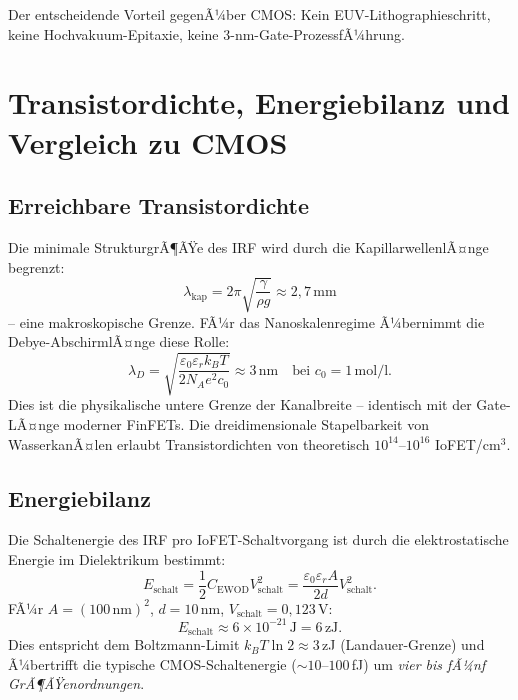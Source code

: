 ﻿\documentclass[a4paper,12pt]{scrreprt}
\theoremstyle{definition}
\begin{document}
Der entscheidende Vorteil gegenÃ¼ber CMOS: Kein EUV-Lithographieschritt,
keine Hochvakuum-Epitaxie, keine 3-nm-Gate-ProzessfÃ¼hrung.

\section{Transistordichte, Energiebilanz und Vergleich zu CMOS}

\subsection{Erreichbare Transistordichte}

Die minimale StrukturgrÃ¶ÃŸe des IRF wird durch die KapillarwellenlÃ¤nge
begrenzt:
\begin{equation}
  \lambda_{\mathrm{kap}} = 2\pi \sqrt{\frac{\gamma}{\rho g}} \approx 2{,}7\,\text{mm}
\end{equation}
-- eine makroskopische Grenze. FÃ¼r das Nanoskalenregime Ã¼bernimmt die
Debye-Abschirm\-lÃ¤nge diese Rolle:
\begin{equation}
  \lambda_D = \sqrt{\frac{\varepsilon_0 \varepsilon_r k_B T}{2 N_A e^2 c_0}} \approx 3\,\text{nm}
  \quad\text{bei } c_0 = 1\,\text{mol/l}.
\end{equation}
Dies ist die physikalische untere Grenze der Kanalbreite -- identisch mit
der Gate-LÃ¤nge moderner FinFETs. Die dreidimensionale Stapelbarkeit von
WasserkanÃ¤len erlaubt Transistordichten von theoretisch $10^{14}$--$10^{16}$
IoFET/cm$^3$.

\subsection{Energiebilanz}

Die Schaltenergie des IRF pro IoFET-Schaltvorgang ist durch die
elektrostatische Energie im Dielektrikum bestimmt:
\begin{equation}
  E_{\mathrm{schalt}} = \frac{1}{2} C_{\mathrm{EWOD}} V_{\mathrm{schalt}}^2
  = \frac{\varepsilon_0 \varepsilon_r A}{2d} V_{\mathrm{schalt}}^2.
\end{equation}
FÃ¼r $A = (100\,\text{nm})^2$, $d = 10$\,nm, $V_{\mathrm{schalt}} = 0{,}123$\,V:
\begin{equation}
  E_{\mathrm{schalt}} \approx 6 \times 10^{-21}\,\text{J} = 6\,\text{zJ}.
\end{equation}
Dies entspricht dem Boltzmann-Limit $k_B T \ln 2 \approx 3$\,zJ
(Landauer-Grenze) und Ã¼bertrifft die typische CMOS-Schaltenergie
($\sim 10$--$100$\,fJ) um \emph{vier bis fÃ¼nf GrÃ¶ÃŸenordnungen}.
\end{document}
